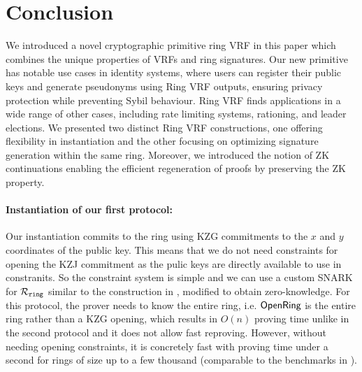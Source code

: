 \section{Conclusion}
\label{sec:conclusion}

We introduced a novel cryptographic primitive ring VRF in this paper which combines the unique properties of VRFs  and ring signatures. Our new primitive has notable use cases in identity systems, where users can register their public keys and generate pseudonyms using Ring VRF outputs, ensuring privacy protection while preventing Sybil behaviour. Ring VRF finds applications in a wide range of other cases, including rate limiting systems, rationing, and leader elections. We presented two distinct Ring VRF constructions, one offering flexibility in instantiation and the other focusing on optimizing signature generation within the same ring. Moreover, we introduced the notion of ZK continuations enabling the efficient regeneration of proofs by preserving the ZK property.

\paragraph{Instantiation of our first protocol:}  Our instantiation commits to the ring using KZG commitments to the $ x $ and $ y $ coordinates of the public key. This means that we do not need constraints for opening the KZJ commitment as the pulic keys are directly available to use in constranits.  So the constraint system is simple and we can use a custom SNARK for $\mathcal{R}_{\mathtt{ring}}$ similar to the construction in \cite{accountable}, modified to obtain zero-knowledge.  For this protocol, the prover needs to know the entire ring, i.e. ${\mathsf{OpenRing}}$ is the entire ring rather than a KZG opening, which results in $O(n)$ proving time unlike in the second protocol and it does not allow fast reproving.
 However, without needing opening constraints, it is concretely fast with proving time under a second for rings of size up to a few thousand (comparable to the benchmarks in \cite{accountable}).  



